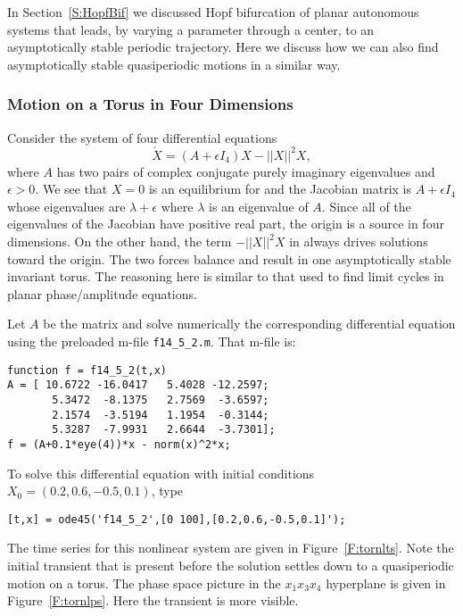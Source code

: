 \documentclass{ximera}
\begin{document}
In Section~\ref{S:HopfBif} we discussed Hopf bifurcation of planar autonomous 
systems that leads, by varying a parameter through a center, to an 
asymptotically stable periodic trajectory.  Here we discuss how we can also 
find asymptotically stable quasiperiodic motions 
in a similar way.  

\subsubsection*{Motion on a Torus in Four Dimensions}

Consider the system of four differential equations 
\begin{equation*}  \label{e:nonlintor}
\dot{X} = (A+\epsilon I_4)X - ||X||^2X,
\end{equation*}
where $A$ has two pairs of complex conjugate purely imaginary eigenvalues
and $\epsilon>0$.  We see that $X=0$ is an equilibrium for 
and the Jacobian 
matrix is $A+\epsilon I_4$ whose eigenvalues 
are $\lambda+\epsilon$ where $\lambda$ is an eigenvalue of $A$.  Since all 
of the eigenvalues of the Jacobian have positive real part, the origin is a 
source in four dimensions.  On the other hand, the term 
$-||X||^2X$ in  always drives solutions toward the origin. 
The two forces balance and result in one asymptotically stable invariant 
torus.   The reasoning here is similar to that used to find limit cycles in
planar phase/amplitude equations.

Let $A$ be the matrix  and solve numerically the corresponding
differential equation  using the preloaded m-file 
{\tt f14\_5\_2.m}. That m-file is:
\begin{verbatim}
function f = f14_5_2(t,x)
A = [ 10.6722 -16.0417   5.4028 -12.2597;
       5.3472  -8.1375   2.7569  -3.6597;
       2.1574  -3.5194   1.1954  -0.3144;
       5.3287  -7.9931   2.6644  -3.7301];
f = (A+0.1*eye(4))*x - norm(x)^2*x;
\end{verbatim}
To solve this differential equation with initial conditions 
$X_0=(0.2,0.6,-0.5,0.1)$, type
\begin{verbatim}
[t,x] = ode45('f14_5_2',[0 100],[0.2,0.6,-0.5,0.1]');
\end{verbatim}

The time series for this nonlinear system are given in Figure~\ref{F:tornlts}.
Note the initial transient that is present before the solution settles 
down to a quasiperiodic motion on a torus.
  The phase space picture in the $x_1x_3x_4$ hyperplane is given 
in Figure~\ref{F:tornlps}.  Here the transient is more visible.
 
\end{document}
